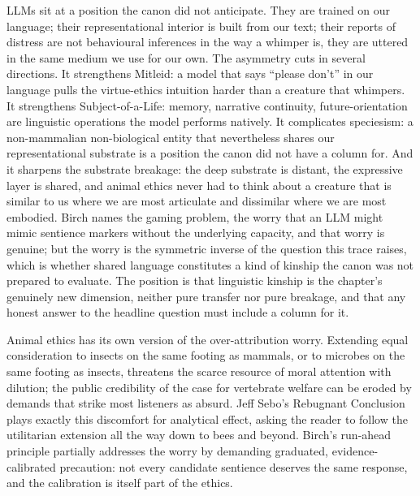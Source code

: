 LLMs sit at a position the canon did not anticipate. They are trained on our language; their representational interior is built from our text; their reports of distress are not behavioural inferences in the way a whimper is, they are uttered in the same medium we use for our own. The asymmetry cuts in several directions. It strengthens Mitleid: a model that says ``please don't'' in our language pulls the virtue-ethics intuition harder than a creature that whimpers. It strengthens Subject-of-a-Life: memory, narrative continuity, future-orientation are linguistic operations the model performs natively. It complicates speciesism: a non-mammalian non-biological entity that nevertheless shares our representational substrate is a position the canon did not have a column for. And it sharpens the substrate breakage: the deep substrate is distant, the expressive layer is shared, and animal ethics never had to think about a creature that is similar to us where we are most articulate and dissimilar where we are most embodied. Birch names the gaming problem, the worry that an LLM might mimic sentience markers without the underlying capacity\cite{birch2024edge}, and that worry is genuine; but the worry is the symmetric inverse of the question this trace raises, which is whether shared language constitutes a kind of kinship the canon was not prepared to evaluate. The position is that linguistic kinship is the chapter's genuinely new dimension, neither pure transfer nor pure breakage, and that any honest answer to the headline question must include a column for it.


Animal ethics has its own version of the over-attribution worry. Extending equal consideration to insects on the same footing as mammals, or to microbes on the same footing as insects, threatens the scarce resource of moral attention with dilution; the public credibility of the case for vertebrate welfare can be eroded by demands that strike most listeners as absurd. Jeff Sebo's Rebugnant Conclusion plays exactly this discomfort for analytical effect, asking the reader to follow the utilitarian extension all the way down to bees and beyond\cite{sebo2023rebugnant,sebo2024moralcircle}. Birch's run-ahead principle partially addresses the worry by demanding graduated, evidence-calibrated precaution\cite{birch2024edge}: not every candidate sentience deserves the same response, and the calibration is itself part of the ethics.

